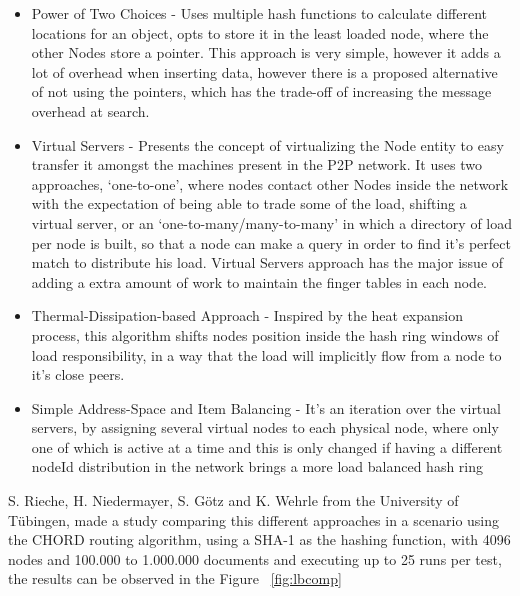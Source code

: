\documentclass{./llncs2e/llncs}
\begin{document}
\begin{itemize}
   \item Power of Two Choices\cite{Byers} - Uses multiple hash functions to calculate different locations for an object, opts to store it in the least loaded node, where the other Nodes store a pointer. This approach is very simple, however it adds a lot of overhead when inserting data, however there is a proposed alternative of not using the pointers, which has the trade-off of increasing the message overhead at search.
   \item Virtual Servers\cite{Rao2003} - Presents the concept of virtualizing the Node entity to easy transfer it amongst the machines present in the P2P network. It uses two approaches, `one-to-one', where nodes contact other Nodes inside the network with the expectation of being able to trade some of the load, shifting a virtual server, or an `one-to-many/many-to-many' in which a directory of load per node is built, so that a node can make a query in order to find it's perfect match to distribute his load. Virtual Servers approach has the major issue of adding a extra amount of work to maintain the finger tables in each node.
   \item Thermal-Dissipation-based Approach\cite{Rieche} - Inspired by the heat expansion process, this algorithm shifts nodes position inside the hash ring windows of load responsibility, in a way that the load will implicitly flow from a node to it's close peers.
   \item Simple Address-Space and Item Balancing\cite{Karger2004} - It's an iteration over the virtual servers, by assigning several virtual nodes to each physical node, where only one of which is active at a time and this is only changed if having a different nodeId distribution in the network brings a more load balanced hash ring
 \end{itemize} 

S. Rieche, H. Niedermayer, S. Götz and  K. Wehrle from the University of Tübingen, made a study comparing this different approaches in a scenario using the CHORD routing algorithm, using a SHA-1 as the hashing function, with 4096 nodes and 100.000 to 1.000.000 documents and executing up to 25 runs per test, the results can be observed in the Figure ~\ref{fig:lbcomp}
\end{document}

